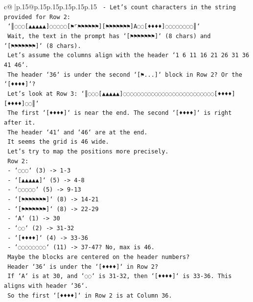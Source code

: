\documentclass{article}
\begin{document}
{\begin{supertabular}{c@{$\;$}|p{.15\linewidth}@{}p{.15\linewidth}p{.15\linewidth}p{.15\linewidth}p{.15\linewidth}p{.15\linewidth}}
{{{\texttt{  {-} Let's count characters in the string provided for Row 2:} \\
\texttt{    `║◌◌◌{[}▲▲▲▲▲{]}◌◌◌◌◌{[}⚑⌜⚑⚑⚑⚑⚑⚑{]}{[}⚑⚑⚑⚑⚑⚑⚑{]}A◌◌{[}♦♦♦♦{]}◌◌◌◌◌◌◌◌║`} \\
\texttt{    Wait, the text in the prompt has `{[}⚑⚑⚑⚑⚑⚑⚑{]}` (8 chars) and `{[}⚑⚑⚑⚑⚑⚑⚑{]}` (8 chars).} \\
\texttt{    Let's assume the columns align with the header `1 6 11 16 21 26 31 36 41 46`.} \\
\texttt{    The header `36` is under the second `{[}⚑...{]}` block in Row 2? Or the `{[}♦♦♦♦{]}`?} \\
\texttt{    Let's look at Row 3: `║◌◌◌{[}▲▲▲▲▲{]}◌◌◌◌◌◌◌◌◌◌◌◌◌◌◌◌◌◌◌◌◌◌◌◌◌◌{[}♦♦♦♦{]}{[}♦♦♦♦{]}◌◌║`} \\
\texttt{    The first `{[}♦♦♦♦{]}` is near the end. The second `{[}♦♦♦♦{]}` is right after it.} \\
\texttt{    The header `41` and `46` are at the end.} \\
\texttt{    It seems the grid is 46 wide.} \\
\texttt{    Let's try to map the positions more precisely.} \\
\texttt{    Row 2:} \\
\texttt{    {-} `◌◌◌` (3) {-}> 1{-}3} \\
\texttt{    {-} `{[}▲▲▲▲▲{]}` (5) {-}> 4{-}8} \\
\texttt{    {-} `◌◌◌◌◌` (5) {-}> 9{-}13} \\
\texttt{    {-} `{[}⚑⚑⚑⚑⚑⚑⚑{]}` (8) {-}> 14{-}21} \\
\texttt{    {-} `{[}⚑⚑⚑⚑⚑⚑⚑{]}` (8) {-}> 22{-}29} \\
\texttt{    {-} `A` (1) {-}> 30} \\
\texttt{    {-} `◌◌` (2) {-}> 31{-}32} \\
\texttt{    {-} `{[}♦♦♦♦{]}` (4) {-}> 33{-}36} \\
\texttt{    {-} `◌◌◌◌◌◌◌◌` (11) {-}> 37{-}47? No, max is 46.} \\
\texttt{    Maybe the blocks are centered on the header numbers?} \\
\texttt{    Header `36` is under the `{[}♦♦♦♦{]}` in Row 2?} \\
\texttt{    If `A` is at 30, and `◌◌` is 31{-}32, then `{[}♦♦♦♦{]}` is 33{-}36. This aligns with header `36`.} \\
\texttt{    So the first `{[}♦♦♦♦{]}` in Row 2 is at Column 36.} \\
\\ 
}}}
\end{supertabular}}
\end{document}
